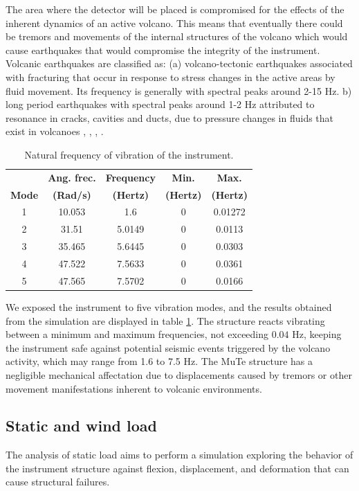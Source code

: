 \documentclass[letterpaper,11pt]{article}
\begin{document}
The area where the detector will be placed is compromised for the effects of the inherent dynamics of an active volcano. This means that eventually there could be tremors and movements of the internal structures of the volcano which would cause earthquakes that would compromise the integrity of the instrument. Volcanic earthquakes are classified as: (a) volcano-tectonic earthquakes associated with fracturing that occur in response to stress changes in the active areas by fluid movement. Its frequency is generally with spectral peaks around 2-15 Hz. b) long period earthquakes with spectral peaks around 1-2 Hz attributed to resonance in cracks, cavities and ducts, due to pressure changes in fluids that exist in volcanoes \cite{mcnutt1992volcanic}, \cite{londono2001spectral}, \cite{langer2006automatic}, \cite{chouet2003volcano}.

\begin{table}[htb]
\begin{center}
\begin{tabular}{ccccc}
\hline
& {\bf Ang. frec.} & {\bf Frequency} & {\bf Min.}  & {\bf Max.}\\
{\bf Mode} & {\bf (Rad/s)} & {\bf (Hertz)} & {\bf (Hertz)} & {\bf (Hertz)} \\
\hline
1 & 10.053 & 1.6 & 0 & 0.01272\\ 
2 & 31.51 & 5.0149  & 0 & 0.0113 \\
3 & 35.465 & 5.6445  & 0 & 0.0303 \\
4 & 47.522 & 7.5633  & 0 & 0.0361 \\
5 & 47.565 & 7.5702 & 0 & 0.0166 \\
\hline
\end{tabular}
\end{center}
\caption{Natural frequency of vibration of the instrument.}
\label{Table_nat_frec1}
\end{table}

We exposed the instrument to five vibration modes, and the results obtained from the simulation are displayed in table \ref{Table_nat_frec1}. The structure reacts vibrating between a minimum and maximum frequencies, not exceeding $0.04$ Hz, keeping the instrument safe against potential seismic events triggered by the volcano activity, which may range from 1.6 to 7.5 Hz. The MuTe structure has a negligible mechanical affectation due to displacements caused by tremors or other movement manifestations inherent to volcanic environments.

\subsection{Static and wind load}
The analysis of static load aims to perform a simulation exploring the behavior of the instrument structure against flexion, displacement, and deformation that can cause structural failures. 
\end{document}
